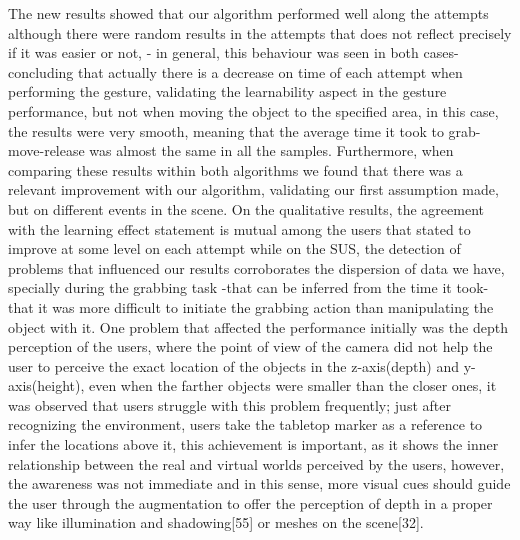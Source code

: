  The new results showed that our algorithm performed well along the attempts although there were random results in the attempts that does not reflect precisely if it was easier or not, - in general, this behaviour was seen in both cases- concluding that actually there is a decrease on time of each attempt when performing the gesture, validating the learnability aspect in the gesture performance, but not when moving the object to the specified area, in this case, the results were very smooth, meaning that the average time it took to grab-move-release was almost the same in all the samples. Furthermore, when comparing these results within both algorithms we found that there was a relevant improvement with our algorithm, validating our first assumption made, but on different events in the scene. On the qualitative results, the agreement with the learning effect statement is mutual among the users that stated to improve at some level on each attempt while on the SUS, the detection of problems that influenced our results corroborates the dispersion of data we have, specially during the grabbing task -that can be inferred from the time it took- that it was more difficult to initiate the grabbing action than manipulating the object with it. One problem that affected the performance initially was the depth perception of the users, where the point of view of the camera did not help the user to perceive the exact location of the objects in the z-axis(depth) and y-axis(height), even when the farther objects were smaller than the closer ones, it was observed that users struggle with this problem frequently; just after recognizing the environment, users take the tabletop marker as a reference to infer the locations above it, this achievement is important, as it shows the inner relationship between the real and virtual worlds perceived by the users, however, the awareness was not immediate and in this sense, more visual cues should guide the user through the augmentation to offer the perception of depth in a proper way like illumination and shadowing[55] or meshes on the scene[32]. 